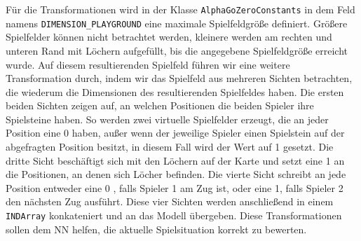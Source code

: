 \documentclass[12pt,a4paper]{article}
\begin{document}
Für die Transformationen wird in der Klasse \texttt{AlphaGoZeroConstants} in dem Feld namens \texttt{DIMENSION\_PLAYGROUND} eine maximale Spielfeldgröße definiert. Größere Spielfelder können nicht betrachtet werden, kleinere werden am rechten und unteren Rand mit Löchern aufgefüllt, bis die angegebene Spielfeldgröße erreicht wurde.
Auf diesem resultierenden Spielfeld führen wir eine weitere Transformation durch, indem wir das Spielfeld aus mehreren Sichten betrachten, die wiederum die Dimensionen des resultierenden Spielfeldes haben. Die ersten beiden Sichten zeigen auf, an welchen Positionen die beiden Spieler ihre Spielsteine haben. So werden zwei virtuelle Spielfelder erzeugt, die an jeder Position eine 0 haben, außer wenn der jeweilige Spieler einen Spielstein auf der abgefragten Position besitzt, in diesem Fall wird der Wert auf \glqq{}1\grqq{} gesetzt. Die dritte Sicht beschäftigt sich mit den Löchern auf der Karte und setzt eine \glqq{}1\grqq{}  an die Positionen, an denen sich Löcher befinden. Die vierte Sicht schreibt an jede Position entweder eine \glqq{}0\grqq{} , falls Spieler 1 am Zug ist, oder eine \glqq{}1\grqq{}, falls Spieler 2 den nächsten Zug ausführt. Diese vier Sichten werden anschließend in einem \texttt{INDArray} konkateniert und an das Modell übergeben. Diese Transformationen sollen dem NN helfen, die aktuelle Spielsituation korrekt zu bewerten. \bigskip
\end{document}

